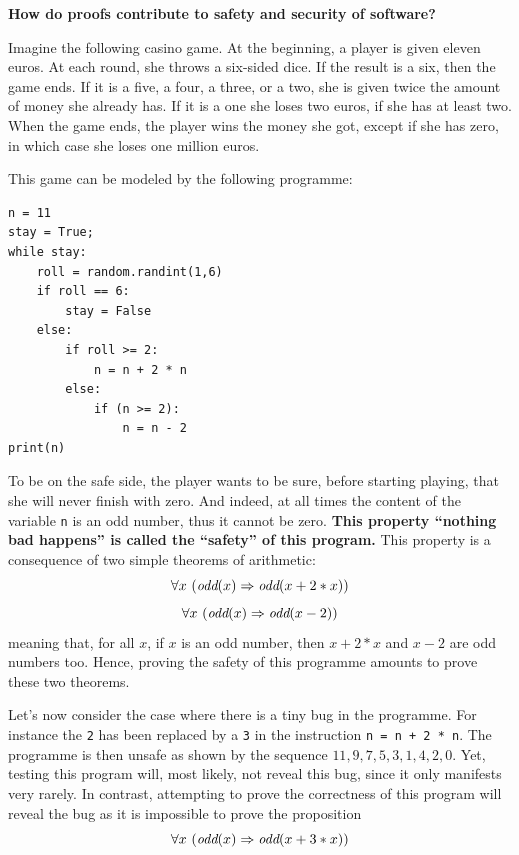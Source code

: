 \begin{framed}
\vspace*{-0.5cm}
\begin{center}
{\bf \Large How do proofs contribute to safety and security of software?}
\end{center}

Imagine the following casino game. At the beginning, a player is given
eleven euros. At each round, she throws a six-sided dice. If the
result is a six, then the game ends.  If it is a five, a four, a
three, or a two, she is given twice the amount of money she already
has. If it is a one she loses two euros, if she has at least two.
When the game ends, the player wins the money she got, except if she
has zero, in which case she loses one million euros.

This game can be modeled by the following programme:
\begin{center}
\begin{minipage}{10cm}
\begin{verbatim}
n = 11
stay = True;
while stay:
    roll = random.randint(1,6)
    if roll == 6:
        stay = False
    else:
        if roll >= 2:
            n = n + 2 * n
        else:
            if (n >= 2):
                n = n - 2
print(n)
\end{verbatim}
\end{minipage}
\end{center}

To be on the safe side, the player wants to be sure, before starting
playing, that she will never finish with zero.  And indeed, at all times
the content of the variable {\tt n} is an odd number,
thus it cannot be zero. {\bf This property ``nothing bad happens'' is
called the ``safety'' of this program.} This property is a
consequence of two simple theorems of arithmetic:
$$\forall x~(\mbox{\it odd}(x) \Rightarrow \mbox{\it odd}(x + 2 * x))$$
$$\forall x~(\mbox{\it odd}(x) \Rightarrow \mbox{\it odd}(x - 2))$$
meaning that, for all $x$, if $x$ is an odd number, then $x+2*x$ and $x-2$ are odd numbers too.
Hence, proving the safety of this programme amounts to prove these two
theorems.

Let's now consider the case where there is a tiny bug in the
programme. For instance the {\tt 2} has been replaced by a {\tt 3} in
the instruction {\tt n = n + 2 * n}. The programme is then unsafe as
shown by the sequence $11, 9, 7, 5, 3, 1, 4, 2, 0$. Yet, testing this
program will, most likely, not reveal this bug, since it only
manifests very rarely.  In contrast, attempting to prove the
correctness of this program will reveal the bug as it is impossible to
prove the proposition
$$\forall x~(\mbox{\it odd}(x) \Rightarrow \mbox{\it odd}(x + 3 * x))$$
\end{framed}

